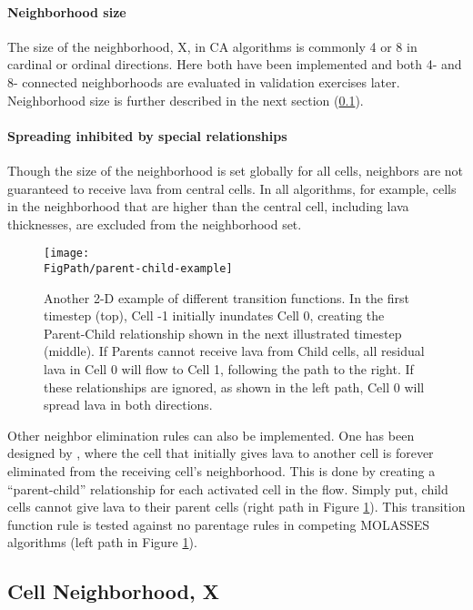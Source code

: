 		\paragraph{Neighborhood size} The size of the neighborhood, X, in CA algorithms is commonly 4 or 8 in cardinal or ordinal directions. Here both have been implemented and both 4- and 8- connected neighborhoods are evaluated in validation exercises later. Neighborhood size is further described in the next section (\ref{sec_X}).

		\paragraph{Spreading inhibited by special relationships} Though the size of the neighborhood is set globally for all cells, neighbors are not guaranteed to receive lava from central cells. In all algorithms, for example, cells in the neighborhood that are higher than the central cell, including lava thicknesses, are excluded from the neighborhood set.
		
		\begin{figure}[!h]
			\centering
			\texttt{[image: \\FigPath/parent-child-example]}
			\caption[A 2-D example of different transition functions with different ``parentage'' rules]{Another 2-D example of different transition functions. In the first timestep (top), Cell -1 initially inundates Cell 0, creating the Parent-Child relationship shown in the next illustrated timestep (middle). If Parents cannot receive lava from Child cells, all residual lava in Cell 0 will flow to Cell 1, following the path to the right. If these relationships are ignored, as shown in the left path, Cell 0 will spread lava in both directions.}
			\label{fig_ParentTrap}
		\end{figure}
		
		Other neighbor elimination rules can also be implemented. One has been designed by \citet{connor2012}, where the cell that initially gives lava to another cell is forever eliminated from the receiving cell's neighborhood. This is done by creating a ``parent-child'' relationship for each activated cell in the flow. Simply put, child cells cannot give lava to their parent cells (right path in Figure \ref{fig_ParentTrap}). This transition function rule is tested against no parentage rules in competing MOLASSES algorithms (left path in Figure \ref{fig_ParentTrap}).
		
	\subsection{Cell Neighborhood, X}\label{sec_X}
	
